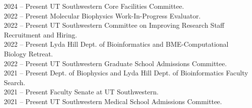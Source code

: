 2024 -- Present \hspace{14pt} UT Southwestern Core Facilities Committee. \\
2022 -- Present \hspace{14pt} Molecular Biophysics Work-In-Progress Evaluator. \\
2022 -- Present \hspace{14pt} UT Southwestern Committee on Improving Research Staff Recruitment and Hiring. \\
2022 -- Present \hspace{14pt} Lyda Hill Dept. of Bioinformatics and BME-Computational Biology Retreat. \\
2022 -- Present \hspace{14pt} UT Southwestern Graduate School Admissions Committee. \\
2021 -- Present \hspace{14pt} Dept. of Biophysics and Lyda Hill Dept. of Bioinformatics Faculty Search. \\
2021 -- Present \hspace{14pt} Faculty Senate at UT Southwestern.  \\
2021 -- Present \hspace{14pt} UT Southwestern Medical School Admissions Committee. \\
\\